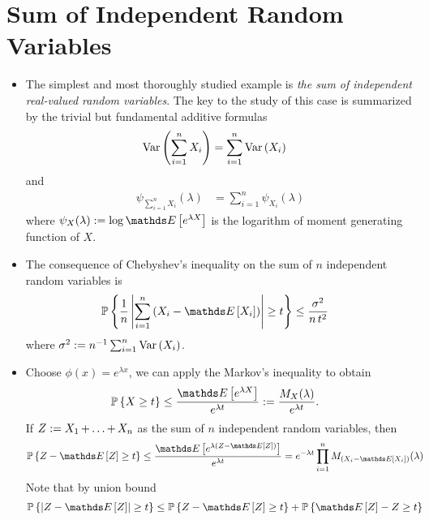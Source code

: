 \documentclass[11pt]{article}
\begin{document}
\section{Sum of Independent Random Variables}
\begin{itemize}
\item The simplest and most thoroughly studied example is \emph{the sum of independent real-valued
random variables}. The key to the study of this case is summarized by the trivial but
fundamental additive formulas
\begin{align*}
\text{Var}\left(\sum_{i=1}^{n}X_i\right) &= \sum_{i=1}^{n}\text{Var}\left(X_i\right)
\end{align*} and
\begin{align*}
\psi_{\sum_{i=1}^{n}X_i}(\lambda) &=  \sum_{i=1}^{n}\psi_{X_i}(\lambda)
\end{align*} where $\psi_{X}(\lambda) := \log   \E{}{e^{\lambda X}}$ is the logarithm of moment generating function of $X$.

\item \begin{remark}
The consequence of Chebyshev’s inequality on the sum of $n$ independent random variables is 
\begin{align*}
\bP\set{\frac{1}{n}\abs{\sum_{i=1}^{n}\paren{X_i - \E{}{X_i}}} \ge t} &\le \frac{\sigma^2}{n\,t^2}
\end{align*} where $\sigma^2 := n^{-1} \sum_{i=1}^{n}\text{Var}\left(X_i\right)$.
\end{remark}

\item \begin{remark}
Choose $\phi(x) = e^{\lambda x}$, we can apply the Markov's inequality to obtain 
\begin{align}
\bP\set{X \ge t} &\le  \frac{\E{}{e^{\lambda X}}}{e^{\lambda t}} := \frac{M_{X}(\lambda)}{e^{\lambda t}}. \label{ineqn: mgf_chernoff_inequality}
\end{align} If $Z := X_1 \,{+}\ldots{+}\, X_n$  as the sum of $n$ independent random variables, then 
\begin{align*}
\bP\set{ Z - \E{}{Z} \ge t} &\le  \frac{\E{}{e^{\lambda (Z - \E{}{Z})}}}{e^{\lambda t}} = e^{-\lambda t} \prod_{i=1}^{n}M_{(X_i - \E{}{X_i})}(\lambda)
\end{align*} Note that by union bound
\begin{align*}
\bP\set{ \abs{Z - \E{}{Z}} \ge t} &\le \bP\set{ Z - \E{}{Z} \ge t} + \bP\set{ \E{}{Z} - Z  \ge t}
\end{align*}
\end{remark}


\end{itemize}
\end{document}
